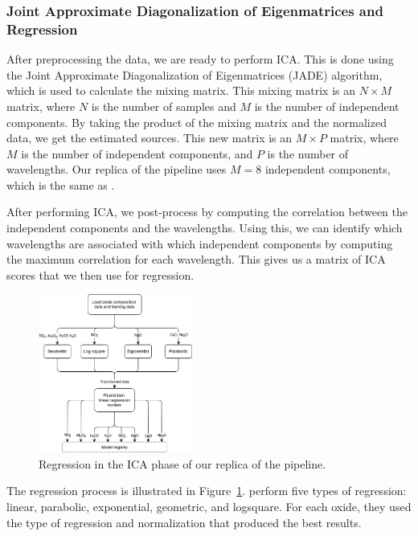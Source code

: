 \subsubsection{Joint Approximate Diagonalization of Eigenmatrices and Regression}
After preprocessing the data, we are ready to perform ICA.
This is done using the Joint Approximate Diagonalization of Eigenmatrices (JADE) algorithm, which is used to calculate the mixing matrix.
This mixing matrix is an $N \times M$ matrix, where $N$ is the number of samples and $M$ is the number of independent components.
By taking the product of the mixing matrix and the normalized data, we get the estimated sources.
This new matrix is an $M \times P$ matrix, where $M$ is the number of independent components, and $P$ is the number of wavelengths.
Our replica of the pipeline uses $M = 8$ independent components, which is the same as \citet{cleggRecalibrationMarsScience2017}.

After performing ICA, we post-process by computing the correlation between the independent components and the wavelengths.
Using this, we can identify which wavelengths are associated with which independent components by computing the maximum correlation for each wavelength.
This gives us a matrix of ICA scores that we then use for regression.

\begin{figure}
	\centering
	\includegraphics[width=0.45\textwidth]{images/ica_regression.png}
	\caption{Regression in the ICA phase of our replica of the pipeline.}
	\label{fig:ica_regression}
\end{figure}

The regression process is illustrated in Figure~\ref{fig:ica_regression}.
\citet{cleggRecalibrationMarsScience2017} perform five types of regression: linear, parabolic, exponential, geometric, and logsquare.
For each oxide, they used the type of regression and normalization that produced the best results.

